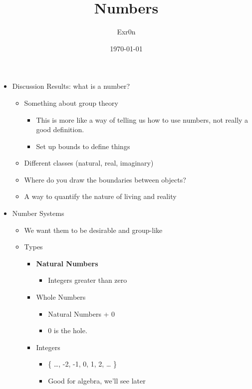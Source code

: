 \documentclass[letterpaper]{article}
\author{Exr0n}
\date{\today}
\title{Numbers}
\renewcommand{\tableofcontents}{}
\begin{document}
\tableofcontents

\begin{itemize}
\item Discussion Results: what is a number?

\begin{itemize}
\item Something about group theory

\begin{itemize}
\item This is more like a way of telling us how to use numbers, not
really a good definition.
\item Set up bounds to define things
\end{itemize}

\item Different classes (natural, real, imaginary)
\item Where do you draw the boundaries between objects?
\item A way to quantify the nature of living and reality
\end{itemize}

\item Number Systems

\begin{itemize}
\item We want them to be desirable and group-like
\item Types

\begin{itemize}
\item \textbf{Natural Numbers}

\begin{itemize}
\item Integers greater than zero
\end{itemize}

\item Whole Numbers

\begin{itemize}
\item Natural Numbers + 0
\item 0 is the hole.
\end{itemize}

\item Integers

\begin{itemize}
\item \{ \ldots{}, -2, -1, 0, 1, 2, \ldots{} \}
\item Good for algebra, we'll see later
\end{itemize}


\end{itemize}
\end{itemize}
\end{itemize}
\end{document}
